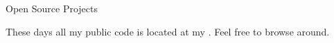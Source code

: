 \begin{rubric}{Open Source Projects}{ 

    \entry* 
    These days all my public code is located at my
    \textbf{}.
    Feel free to browse around.

}\end{rubric}
